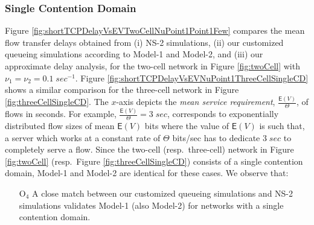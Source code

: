 \documentclass[10pt,a4paper,journal]{IEEEtran}
\theoremstyle{definition}
\theoremstyle{remark}
\theoremstyle{plain}
\newcommand{\EXP}[1]{\mathsf{E}\!\left(#1\right)}
\begin{document}
\subsubsection{Single Contention Domain}
\label{subsubsec:single-contention-domain}

Figure \ref{fig:shortTCPDelayVsEVTwoCellNuPoint1Point1Few} compares
the mean flow transfer delays obtained from (i) NS-2 simulations, (ii)
our customized queueing simulations according to Model-1 and Model-2, and
(iii) our approximate delay analysis, for the two-cell network in
Figure \ref{fig:twoCell} with $\nu_1 = \nu_2 = 0.1 \;
sec^{-1}$. Figure \ref{fig:shortTCPDelayVsEVNuPoint1ThreeCellSingleCD}
shows a similar comparison for the three-cell network in Figure
\ref{fig:threeCellSingleCD}. The $x$-axis depicts the \textit{mean
  service requirement}, $\frac{\EXP{V}}{\Theta}$, of flows in
seconds. For example, $\frac{\EXP{V}}{\Theta} =  3 \; sec$,
corresponds to exponentially distributed flow sizes of mean $\EXP{V}$
bits where the value of $\EXP{V}$ is such that, a server which works
at a constant rate of $\Theta$ bits/sec has to dedicate $3 \; sec$ to
completely serve a flow. Since the two-cell (resp.~three-cell) network
in Figure \ref{fig:twoCell} (resp.~Figure \ref{fig:threeCellSingleCD})
consists of a single contention domain, Model-1 and Model-2 are
identical for these cases. We observe that: 
\begin{itemize}

\item [O$_4$] A close match between our customized queueing simulations 
and NS-2 simulations validates Model-1 (also Model-2) for networks with 
a single contention domain.  

\end{itemize}
\end{document}
